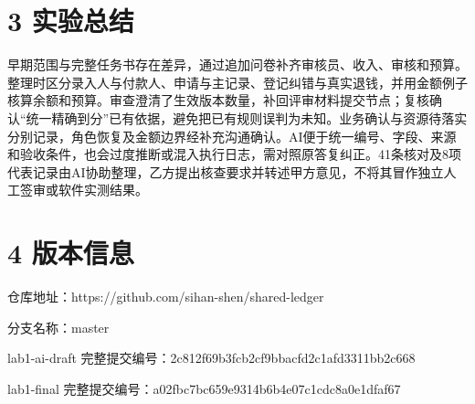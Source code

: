 \documentclass[10pt,a4paper]{article}
\begin{document}
\section*{3 实验总结}
早期范围与完整任务书存在差异，通过追加问卷补齐审核员、收入、审核和预算。整理时区分录入人与付款人、申请与主记录、登记纠错与真实退钱，并用金额例子核算余额和预算。审查澄清了生效版本数量，补回评审材料提交节点；复核确认“统一精确到分”已有依据，避免把已有规则误判为未知。业务确认与资源待落实分别记录，角色恢复及金额边界经补充沟通确认。AI便于统一编号、字段、来源和验收条件，也会过度推断或混入执行日志，需对照原答复纠正。41条核对及8项代表记录由AI协助整理，乙方提出核查要求并转述甲方意见，不将其冒作独立人工签审或软件实测结果。

\section*{4 版本信息}
仓库地址：https://github.com/sihan-shen/shared-ledger

分支名称：master

lab1-ai-draft 完整提交编号：2c812f69b3fcb2cf9bbacfd2c1afd3311bb2c668

lab1-final 完整提交编号：a02fbc7bc659e9314b6b4e07c1cdc8a0e1dfaf67
\end{document}
